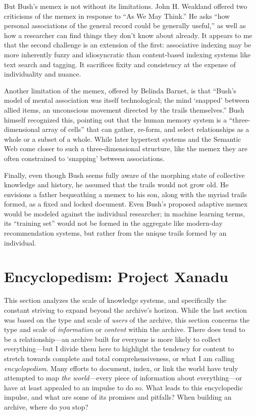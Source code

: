 But Bush's memex is not without its limitations. John H. Weakland offered two criticisms of the memex in response to ``As We May Think.'' He asks ``how personal associations of the general record could be generally useful,'' as well as how a researcher can find things they don't know about already.\autocite[217]{nyce_innovation_1989} It appears to me that the second challenge is an extension of the first: associative indexing may be more inherently fuzzy and idiosyncratic than content-based indexing systems like text search and tagging. It sacrifices fixity and consistency at the expense of individuality and nuance.

Another limitation of the memex, offered by Belinda Barnet, is that ``Bush's model of mental association was itself technological; the mind `snapped' between allied items, an unconscious movement directed by the trails themselves.''\autocite{barnet_technical_2008} Bush himself recognized this, pointing out that the human memory system is a ``three-dimensional array of cells'' that can gather, re-form, and select relationships as a whole or a subset of a whole.\autocite[209]{bush_memex_1991} While later hypertext systems and the Semantic Web come closer to such a three-dimensional structure, like the memex they are often constrained to `snapping' between associations.

Finally, even though Bush seems fully aware of the morphing state of collective knowledge and history, he assumed that the trails would not grow old. He envisions a father bequeathing a memex to his son, along with the myriad trails formed, as a fixed and locked document. Even Bush's proposed adaptive memex would be modeled against the individual researcher; in machine learning terms, its ``training set'' would not be formed in the aggregate like modern-day recommendation systems, but rather from the unique trails formed by an individual.

\section{Encyclopedism: Project Xanadu}

This section analyzes the scale of knowledge systems, and specifically the constant striving to expand beyond the archive's horizon. While the last section was based on the type and scale of \emph{users} of the archive, this section concerns the type and scale of \emph{information} or \emph{content} within the archive. There does tend to be a relationship---an archive built for everyone is more likely to collect everything---but I divide them here to highlight the tendency for content to stretch towards complete and total comprehensiveness, or what I am calling \emph{encyclopedism}. Many efforts to document, index, or link the world have truly attempted to map \emph{the world}---every piece of information about everything---or have at least appealed to an impulse to do so. What leads to this encyclopedic impulse, and what are some of its promises and pitfalls? When building an archive, where do you stop?

